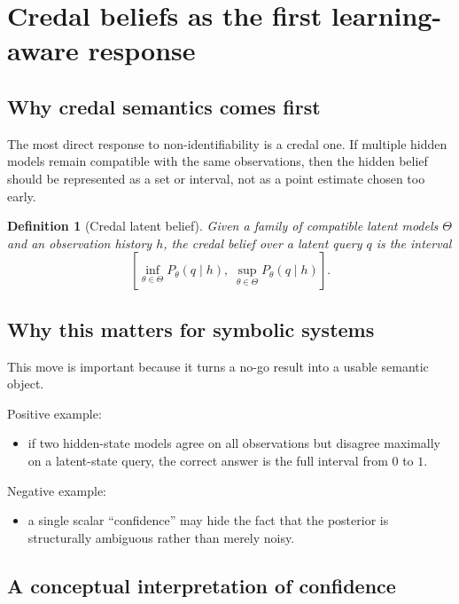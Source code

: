 \documentclass[11pt]{article}
\newtheorem{definition}{Definition}
\begin{document}
\section{Credal beliefs as the first learning-aware response}

\subsection{Why credal semantics comes first}

The most direct response to non-identifiability is a credal one.  If multiple
hidden models remain compatible with the same observations, then the hidden
belief should be represented as a set or interval, not as a point estimate
chosen too early.

\begin{definition}[Credal latent belief]
Given a family of compatible latent models $\Theta$ and an observation history
$h$, the credal belief over a latent query $q$ is the interval
\[
\left[\inf_{\theta \in \Theta} P_\theta(q \mid h),\;
\sup_{\theta \in \Theta} P_\theta(q \mid h)\right].
\]
\end{definition}

\subsection{Why this matters for symbolic systems}

This move is important because it turns a no-go result into a usable semantic
object.

Positive example:
\begin{itemize}
  \item if two hidden-state models agree on all observations but disagree
        maximally on a latent-state query, the correct answer is the full
        interval from $0$ to $1$.
\end{itemize}

Negative example:
\begin{itemize}
  \item a single scalar ``confidence'' may hide the fact that the posterior is
        structurally ambiguous rather than merely noisy.
\end{itemize}

\subsection{A conceptual interpretation of confidence}
\end{document}
